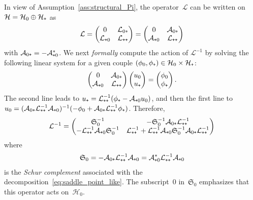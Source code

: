 \documentclass{article}
\newcommand{\cL}{\mathcal{L}}
\newcommand{\cLa}{\mathcal{A}}
\newcommand{\Schur}{\mathfrak{S}_0}
\newcommand{\cH}{\mathcal{H}}
\newcommand{\subplus}{\textnormal{\texttt{+}}}
\begin{document}
In view of Assumption~\ref{ass:structural_Pi}, the operator~$\cL$ can be written on $\cH = \cH_{0} \oplus \cH_{\subplus}$ as
\begin{equation}
  \label{eq:saddle_point_like}
  \cL = \begin{pmatrix} 0 & \cL_{0\subplus}\\
    \cL_{\subplus0} & \cL_{\subplus\subplus} \end{pmatrix}
 = \begin{pmatrix} 0 & \cLa_{0\subplus}\\
    \cLa_{\subplus0} & \cL_{\subplus\subplus} \end{pmatrix}
\end{equation}
with $\cLa_{0\subplus} = -\cLa_{\subplus0}^{*}$. We next \emph{formally} compute the action of $\cL^{-1}$ by solving the following linear system for a given couple $(\phi_{0},\phi_{\subplus}) \in \cH_0 \times \cH_\subplus$:
\[
\begin{pmatrix} 0 & \cLa_{0\subplus}\\
  \cLa_{\subplus0} & \cL_{\subplus\subplus} \end{pmatrix} \begin{pmatrix} u_{0} \\ u_{\subplus} \end{pmatrix} =  \begin{pmatrix} \phi_{0} \\ \phi_{\subplus} \end{pmatrix}.
\]
The second line leads to $u_{\subplus} = \cL_{\subplus\subplus}^{-1}(\phi_{\subplus} - \cLa_{\subplus0} u_{0})$, and then the first line
to $u_{0} = (\cLa_{0\subplus} \cL_{\subplus\subplus}^{-1} \cLa_{\subplus0})^{-1}(-\phi_{0} + \cLa_{0\subplus} \cL_{\subplus\subplus}^{-1} \phi_{\subplus})$. Therefore,
\begin{equation}
  \label{eq:formal_action_resolvent}
  \cL^{-1} =
  \begin{pmatrix}
    \Schur^{-1} & -\Schur^{-1} \cLa_{0\subplus} \cL_{\subplus\subplus}^{-1}\\
    -\cL_{\subplus\subplus}^{-1} \cLa_{\subplus0} \Schur^{-1}  & \cL_{\subplus\subplus}^{-1} + \cL_{\subplus\subplus}^{-1} \cLa_{\subplus0} \Schur^{-1} \cLa_{0\subplus} \cL_{\subplus\subplus}^{-1}
  \end{pmatrix}
\end{equation}
where 
\begin{align*}
  \Schur = -\cLa_{0\subplus} \cL_{\subplus\subplus}^{-1} \cLa_{\subplus0} = \cLa_{\subplus0}^{*} \cL_{\subplus\subplus}^{-1} \cLa_{\subplus0} 
\end{align*}
is the \textit{Schur complement} associated with the decomposition~\eqref{eq:saddle_point_like}. The subscript~0 in~$\Schur$ emphasizes that this operator acts on~$\cH_0$.
\end{document}

